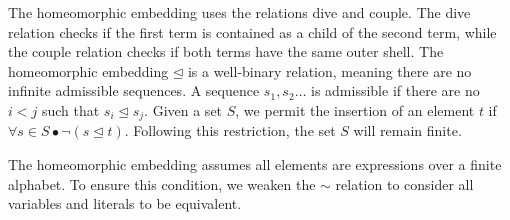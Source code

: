 The homeomorphic embedding uses the relations dive and couple. The dive relation checks if the first term is contained as a child of the second term, while the couple relation checks if both terms have the same outer shell. The homeomorphic embedding $\unlhd$ is a well-binary relation, meaning there are no infinite admissible sequences. A sequence $s_1,s_2 \ldots$ is admissible if there are no $i < j$ such that $s_i \unlhd s_j$. Given a set $S$, we permit the insertion of an element $t$ if $\forall s \in S \bullet \neg(s \unlhd t)$. Following this restriction, the set $S$ will remain finite.

The homeomorphic embedding assumes all elements are expressions over a finite alphabet. To ensure this condition, we weaken the $\sim$ relation to consider all variables and literals to be equivalent.
